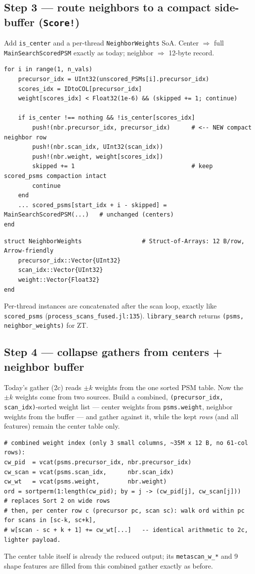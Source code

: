 \documentclass[11pt]{article}
\newcommand{\code}[1]{\texttt{\small #1}}
\begin{document}
\subsection*{Step 3 --- route neighbors to a compact side-buffer (\code{Score!})}
Add \code{is\_center} and a per-thread \code{NeighborWeights} SoA. Center $\Rightarrow$
full \code{MainSearchScoredPSM} exactly as today; neighbor $\Rightarrow$ 12-byte record.
\begin{lstlisting}[firstnumber=1]
for i in range(1, n_vals)
    precursor_idx = UInt32(unscored_PSMs[i].precursor_idx)
    scores_idx = IDtoCOL[precursor_idx]
    weight[scores_idx] < Float32(1e-6) && (skipped += 1; continue)

    if is_center !== nothing && !is_center[scores_idx]
        push!(nbr.precursor_idx, precursor_idx)      # <-- NEW compact neighbor row
        push!(nbr.scan_idx, UInt32(scan_idx))
        push!(nbr.weight, weight[scores_idx])
        skipped += 1                                 # keep scored_psms compaction intact
        continue
    end
    ... scored_psms[start_idx + i - skipped] = MainSearchScoredPSM(...)   # unchanged (centers)
end
\end{lstlisting}
\begin{lstlisting}[firstnumber=1]
struct NeighborWeights                 # Struct-of-Arrays: 12 B/row, Arrow-friendly
    precursor_idx::Vector{UInt32}
    scan_idx::Vector{UInt32}
    weight::Vector{Float32}
end
\end{lstlisting}
Per-thread instances are concatenated after the scan loop, exactly like
\code{scored\_psms} (\code{process\_scans\_fused.jl:135}). \code{library\_search} returns
\code{(psms, neighbor\_weights)} for ZT.

\subsection*{Step 4 --- collapse gathers from centers + neighbor buffer}
Today's gather (2c) reads $\pm k$ weights from the one sorted PSM table. Now the
$\pm k$ weights come from two sources. Build a combined, \code{(precursor\_idx,
scan\_idx)}-sorted weight list --- center weights from \code{psms.weight}, neighbor
weights from the buffer --- and gather against it, while the kept \emph{rows} (and all
features) remain the center table only.
\begin{lstlisting}[firstnumber=1]
# combined weight index (only 3 small columns, ~35M x 12 B, no 61-col rows):
cw_pid  = vcat(psms.precursor_idx, nbr.precursor_idx)
cw_scan = vcat(psms.scan_idx,      nbr.scan_idx)
cw_wt   = vcat(psms.weight,        nbr.weight)
ord = sortperm(1:length(cw_pid); by = j -> (cw_pid[j], cw_scan[j]))   # replaces Sort 2 on wide rows
# then, per center row c (precursor pc, scan sc): walk ord within pc for scans in [sc-k, sc+k],
# w[scan - sc + k + 1] += cw_wt[...]   -- identical arithmetic to 2c, lighter payload.
\end{lstlisting}
The center table itself is already the reduced output; its \code{metascan\_w\_*} and 9
shape features are filled from this combined gather exactly as before.
\end{document}
